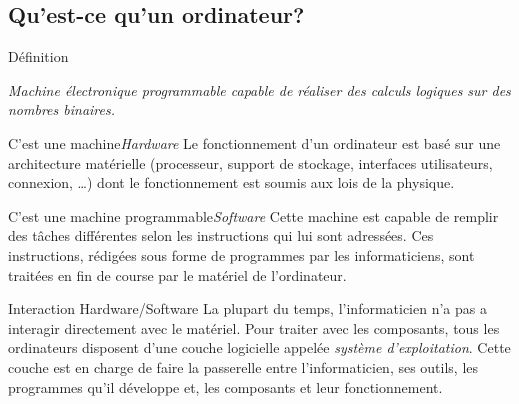\subsection{Qu'est-ce qu'un ordinateur?}
\begin{frame}{Définition}
  \begin{definition}[Ordinateur]\it
    Machine électronique programmable capable de réaliser des calculs
    logiques sur des nombres binaires.
  \end{definition}
  \begin{block}{C'est une machine\hfill\emph{Hardware}}
    Le fonctionnement d'un ordinateur est basé sur une architecture
    matérielle (processeur, support de stockage, interfaces
    utilisateurs, connexion, \dots) dont le fonctionnement est soumis
    aux lois de la physique.
  \end{block}
  \begin{block}{C'est une machine programmable\hfill\emph{Software}}
    Cette machine est capable de remplir des tâches différentes selon
    les instructions qui lui sont adressées. Ces instructions, rédigées
    sous forme de programmes par les informaticiens, sont traitées en
    fin de course par le matériel de l'ordinateur.
  \end{block}
  \begin{alertblock}{Interaction Hardware/Software}
    La plupart du temps, l'informaticien n'a pas a interagir directement
    avec le matériel. Pour traiter avec les composants, tous les
    ordinateurs disposent d'une couche logicielle appelée
    \emph{système d'exploitation}. Cette couche est en charge de faire la
    passerelle entre l'informaticien, ses outils, les programmes qu'il
    développe et, les composants et leur fonctionnement.
  \end{alertblock}
\end{frame}

